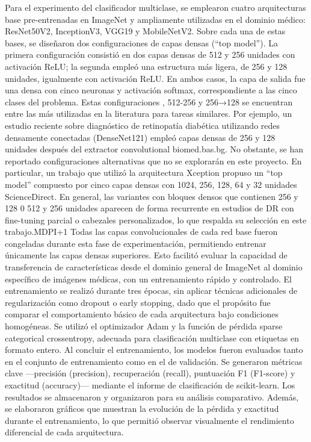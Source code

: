 Para el experimento del clasificador multiclase, se emplearon cuatro arquitecturas base
pre-entrenadas en ImageNet y ampliamente utilizadas en el dominio médico: ResNet50V2,
InceptionV3, VGG19 y MobileNetV2. Sobre cada una de estas bases, se diseñaron dos
configuraciones de capas densas (“top model”). La primera configuración consistió en dos
capas densas de 512 y 256 unidades con activación ReLU; la segunda empleó una estructura
más ligera, de 256 y 128 unidades, igualmente con activación ReLU. En ambos casos, la capa
de salida fue una densa con cinco neuronas y activación softmax, correspondiente a las
cinco clases del problema.
Estas configuraciones , 512-256 y 256→128 se encuentran entre las más utilizadas en la
literatura para tareas similares. Por ejemplo, un estudio reciente sobre diagnóstico de
retinopatía diabética utilizando redes densamente conectadas (DenseNet121) empleó capas
densas de 256 y 128 unidades después del extractor convolutional biomed.bas.bg. No
obstante, se han reportado configuraciones alternativas que no se explorarán en este
proyecto. En particular, un trabajo que utilizó la arquitectura Xception propuso un “top
model” compuesto por cinco capas densas con 1024, 256, 128, 64 y 32 unidades
ScienceDirect. En general, las variantes con bloques densos que contienen 256 y 128 0 512
y 256 unidades aparecen de forma recurrente en estudios de DR con fine-tuning parcial o
cabezales personalizados, lo que respalda su selección en este trabajo.MDPI+1
Todas las capas convolucionales de cada red base fueron congeladas durante esta fase de
experimentación, permitiendo entrenar únicamente las capas densas superiores. Esto
facilitó evaluar la capacidad de transferencia de características desde el dominio general
de ImageNet al dominio específico de imágenes médicas, con un entrenamiento rápido y
controlado.
El entrenamiento se realizó durante tres épocas, sin aplicar técnicas adicionales de
regularización como dropout o early stopping, dado que el propósito fue comparar el
comportamiento básico de cada arquitectura bajo condiciones homogéneas. Se utilizó el
optimizador Adam y la función de pérdida sparse categorical crossentropy, adecuada para
clasificación multiclase con etiquetas en formato entero.
Al concluir el entrenamiento, los modelos fueron evaluados tanto en el conjunto de
entrenamiento como en el de validación. Se generaron métricas clave —precisión
(precision), recuperación (recall), puntuación F1 (F1-score) y exactitud (accuracy)—
mediante el informe de clasificación de scikit-learn. Los resultados se almacenaron y
organizaron para su análisis comparativo. Además, se elaboraron gráficos que muestran la
evolución de la pérdida y exactitud durante el entrenamiento, lo que permitió observar
visualmente el rendimiento diferencial de cada arquitectura.

